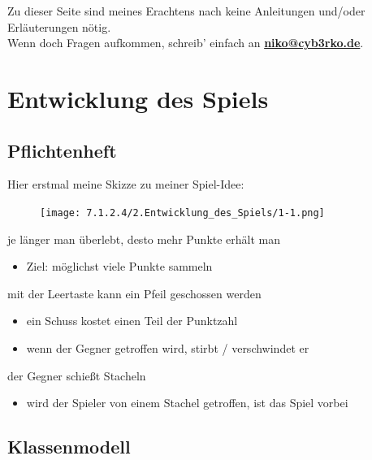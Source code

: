 \documentclass{scrartcl}   %
\begin{document}
Zu dieser Seite sind meines Erachtens nach keine Anleitungen und/oder Erläuterungen nötig.\\
Wenn doch Fragen aufkommen, schreib' einfach an \textbf{\href{mailto:niko@cyb3rko.de}{niko@cyb3rko.de}}.

\newpage

\section{Entwicklung des Spiels}

\subsection{Pflichtenheft}

Hier erstmal meine Skizze zu meiner Spiel-Idee:\\
\begin{figure}[ht]
\begin{turn}{-90}
	\texttt{[image: 7.1.2.4/2.Entwicklung\_des\_Spiels/1-1.png]}
\end{turn}
\end{figure}

\begin{itemize}
    \barrow je länger man überlebt, desto mehr Punkte erhält man
    \begin{itemize}
        \item Ziel: möglichst viele Punkte sammeln
    \end{itemize}
    \barrow mit der Leertaste kann ein Pfeil geschossen werden
    \begin{itemize}
        \item ein Schuss kostet einen Teil der Punktzahl
        \item wenn der Gegner getroffen wird, stirbt / verschwindet er
    \end{itemize}
    \newpage
    \barrow der Gegner schießt Stacheln
    \begin{itemize}
        \item wird der Spieler von einem Stachel getroffen, ist das Spiel vorbei
    \end{itemize}
\end{itemize}

\subsection{Klassenmodell}
\end{document}
